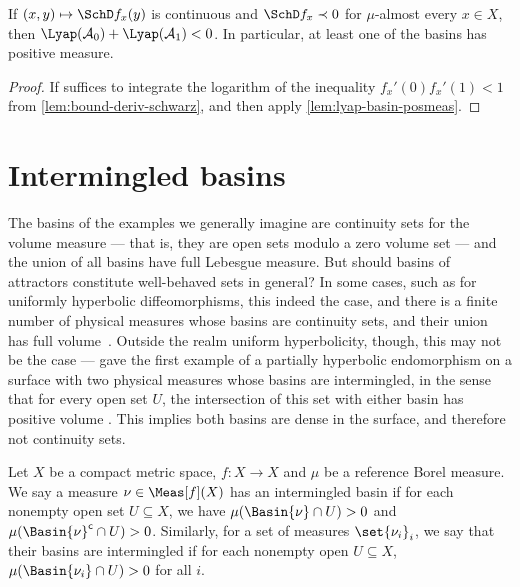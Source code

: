 \documentclass[../main]{subfiles}
\begin{document}
\begin{corollary}\label{cor:schwarz-basin-pos-meas}
  If \((x,y) \mapsto \SchD f_x(y)\) is continuous and \(\SchD f_x \prec 0\) for \(\mu\)-almost every \(x \in X\), then \(\Lyap(\mathcal{A}_0) + \Lyap(\mathcal{A}_1) < 0\).
  In particular, at least one of the basins has positive measure.
\end{corollary}

\begin{proof}
  If suffices to integrate the logarithm of the inequality \(f_x'(0)f_x'(1) < 1\) from \cref{lem:bound-deriv-schwarz}, and then apply \cref{lem:lyap-basin-posmeas}.
\end{proof}

\section{Intermingled basins}\label{sec:intermingled-basins}

The basins of the examples we generally imagine are continuity sets for the volume measure --- that is, they are open sets modulo a zero volume set --- and the union of all basins have full Lebesgue measure. But should basins of attractors constitute well-behaved sets in general? In some cases, such as for uniformly hyperbolic diffeomorphisms, this indeed the case, and there is a finite number of physical measures whose basins are continuity sets, and their union has full volume~\cite{uresNonrobustnessIntermingledBasins2018}. Outside the realm uniform hyperbolicity, though, this may not be the case --- \textcite{kanOpenSetsDiffeomorphisms1994} gave the first example of a partially hyperbolic endomorphism on a surface with two physical measures whose basins are intermingled, in the sense that for every open set \(U\), the intersection of this set with either basin has positive volume \cite{uresNonrobustnessIntermingledBasins2018}. This implies both basins are dense in the surface, and therefore not continuity sets.

\begin{definition}
  Let \(X\) be a compact metric space, \(f \colon X \to X\) and \(\mu\) be a reference Borel measure. We say a measure \(\nu \in \Meas[f](X)\) has an intermingled basin if for each nonempty open set \(U \subseteq X\), we have \(\mu(\Basin{\nu} \cap U) > 0\) and \(\mu(\Basin{\nu}^{\complement} \cap U) > 0\). Similarly, for a set of measures \(\set{\nu_i}_i\), we say that their basins are intermingled if for each nonempty open \(U \subseteq X\), \(\mu(\Basin{\nu_i} \cap U) > 0\) for all \(i\).
\end{definition}
\end{document}

